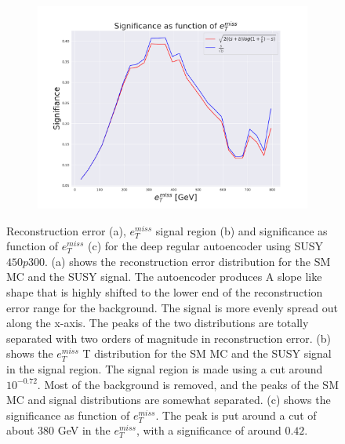 \begin{figure}[H]
    \hfill 
    \begin{subfigure}{.40\textwidth}
        \includegraphics[width=\textwidth]{Figures/AE_testing/big/2lep/significance_etmiss_450p0p0300_-0.7180276969063684.pdf}
        \caption{}
        \label{fig:AE_2lep_big_signi_450_3}
    \end{subfigure}
    \hfill      
    \caption[2lep deep network | $450p300$ | AE | 3]{Reconstruction error (a), $e_T^{miss}$ signal region (b) and significance as function of 
    $e_T^{miss}$ (c) for the deep regular autoencoder using SUSY $450p300$. 
    (a) shows the reconstruction error distribution for the SM MC and the SUSY signal. 
    The autoencoder produces A slope like shape that is highly shifted to the lower end of the reconstruction error range
for the background. The signal is more evenly spread out along the x-axis. The peaks of the two distributions are totally separated
with two orders of magnitude in reconstruction error. (b) shows the $e_T^{miss}$
T distribution for the SM MC and the SUSY signal in the signal region. The signal region is made using a cut around
$10^{-0.72}$. Most of the background is removed, and the peaks of the SM MC and signal distributions are
somewhat separated. (c) shows the significance as function of $e_T^{miss}$. The peak is put 
around a cut of about 380 GeV in the $e_T^{miss}$, with a significance of around $0.42$.}
    \label{fig:AE_2lep_big_rec_sig_signi_450_3}
\end{figure}

